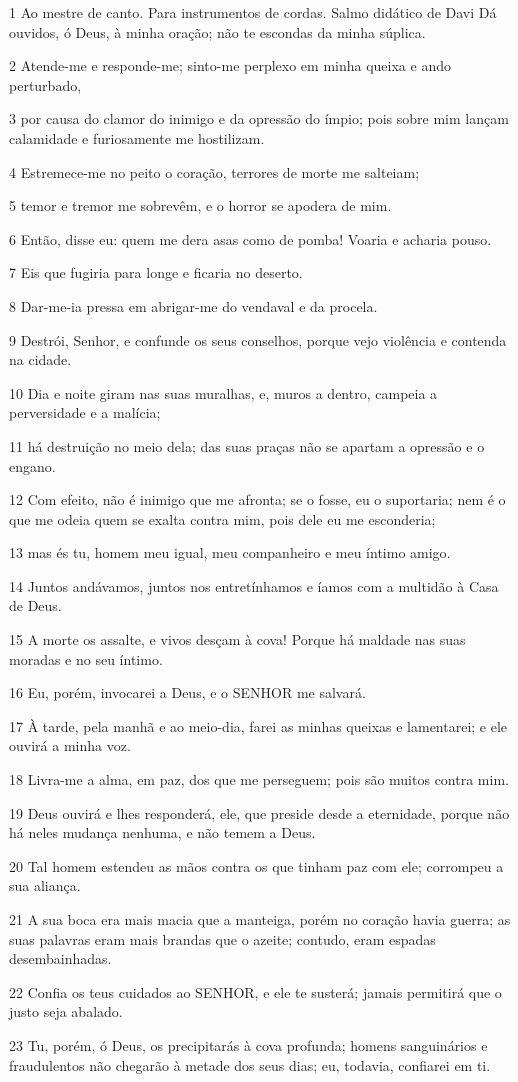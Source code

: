 \par 1 Ao mestre de canto. Para instrumentos de cordas. Salmo didático de Davi Dá ouvidos, ó Deus, à minha oração; não te escondas da minha súplica.
\par 2 Atende-me e responde-me; sinto-me perplexo em minha queixa e ando perturbado,
\par 3 por causa do clamor do inimigo e da opressão do ímpio; pois sobre mim lançam calamidade e furiosamente me hostilizam.
\par 4 Estremece-me no peito o coração, terrores de morte me salteiam;
\par 5 temor e tremor me sobrevêm, e o horror se apodera de mim.
\par 6 Então, disse eu: quem me dera asas como de pomba! Voaria e acharia pouso.
\par 7 Eis que fugiria para longe e ficaria no deserto.
\par 8 Dar-me-ia pressa em abrigar-me do vendaval e da procela.
\par 9 Destrói, Senhor, e confunde os seus conselhos, porque vejo violência e contenda na cidade.
\par 10 Dia e noite giram nas suas muralhas, e, muros a dentro, campeia a perversidade e a malícia;
\par 11 há destruição no meio dela; das suas praças não se apartam a opressão e o engano.
\par 12 Com efeito, não é inimigo que me afronta; se o fosse, eu o suportaria; nem é o que me odeia quem se exalta contra mim, pois dele eu me esconderia;
\par 13 mas és tu, homem meu igual, meu companheiro e meu íntimo amigo.
\par 14 Juntos andávamos, juntos nos entretínhamos e íamos com a multidão à Casa de Deus.
\par 15 A morte os assalte, e vivos desçam à cova! Porque há maldade nas suas moradas e no seu íntimo.
\par 16 Eu, porém, invocarei a Deus, e o SENHOR me salvará.
\par 17 À tarde, pela manhã e ao meio-dia, farei as minhas queixas e lamentarei; e ele ouvirá a minha voz.
\par 18 Livra-me a alma, em paz, dos que me perseguem; pois são muitos contra mim.
\par 19 Deus ouvirá e lhes responderá, ele, que preside desde a eternidade, porque não há neles mudança nenhuma, e não temem a Deus.
\par 20 Tal homem estendeu as mãos contra os que tinham paz com ele; corrompeu a sua aliança.
\par 21 A sua boca era mais macia que a manteiga, porém no coração havia guerra; as suas palavras eram mais brandas que o azeite; contudo, eram espadas desembainhadas.
\par 22 Confia os teus cuidados ao SENHOR, e ele te susterá; jamais permitirá que o justo seja abalado.
\par 23 Tu, porém, ó Deus, os precipitarás à cova profunda; homens sanguinários e fraudulentos não chegarão à metade dos seus dias; eu, todavia, confiarei em ti.

